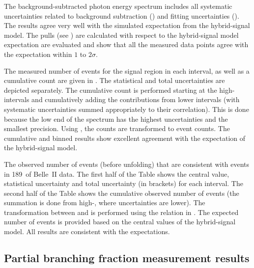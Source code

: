 The background-subtracted photon energy spectrum includes all systematic uncertainties related 
to background subtraction ()
and fitting uncertainties ().
The results agree very well with the simulated expectation from the hybrid-signal model.
The pulls (see ) are calculated with respect to the hybrid-signal model expectation are evaluated 
and show that all the measured data points agree with the expectation within $1$ to $2\sigma$.

The measured number of events for the signal region in each \EB interval, as well as a cumulative count are given in .
The statistical and total uncertainties are depicted separately.
The cumulative count is performed starting at the high-\EB intervals and cumulatively adding the contributions from lower \EB intervals (with systematic uncertainties summed appropriately to their correlation).
This is done because the low end of the \EB spectrum has the highest uncertainties and the smallest precision.
Using , the \BtoXsdgamma counts are transformed to \BtoXsgamma event counts.
The cumulative and binned results show excellent agreement with the expectation of the hybrid-signal model.

\begin{table}[hbtp!]
    \caption{\label{tab:observed_events}
    The observed number of events (before unfolding) that are consistent with \mbox{\BtoXsdgamma} events in 189~\invfb of Belle~II data.
    The first half of the Table shows the central value, statistical uncertainty and total uncertainty (in brackets) for each \EB interval.
    The second half of the Table shows the cumulative observed number of events (the summation is done from high-\EB, where uncertainties are lower).
    The transformation between \BtoXsdgamma and \BtoXsgamma is performed using the relation in .
    The expected number of \BtoXsgamma events is provided based on the central values of the hybrid-signal model.
    All results are consistent with the expectations.
    }
    
\end{table}


\subsection{Partial branching fraction measurement results}\label{sec:partial_branching_fraction_results}

